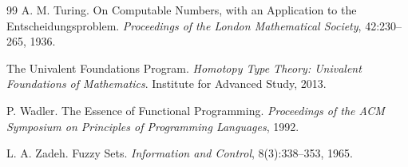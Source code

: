 \documentclass[12pt,oneside]{article}
\begin{document}
\begin{thebibliography}{99}
A. M. Turing.
\newblock On Computable Numbers, with an Application to the Entscheidungsproblem.
\newblock \emph{Proceedings of the London Mathematical Society}, 42:230--265, 1936.

The Univalent Foundations Program.
\newblock \emph{Homotopy Type Theory: Univalent Foundations of Mathematics}.
\newblock Institute for Advanced Study, 2013.

P. Wadler.
\newblock The Essence of Functional Programming.
\newblock \emph{Proceedings of the ACM Symposium on Principles of Programming Languages}, 1992.

L. A. Zadeh.
\newblock Fuzzy Sets.
\newblock \emph{Information and Control}, 8(3):338--353, 1965.

\end{thebibliography}
\end{document}
